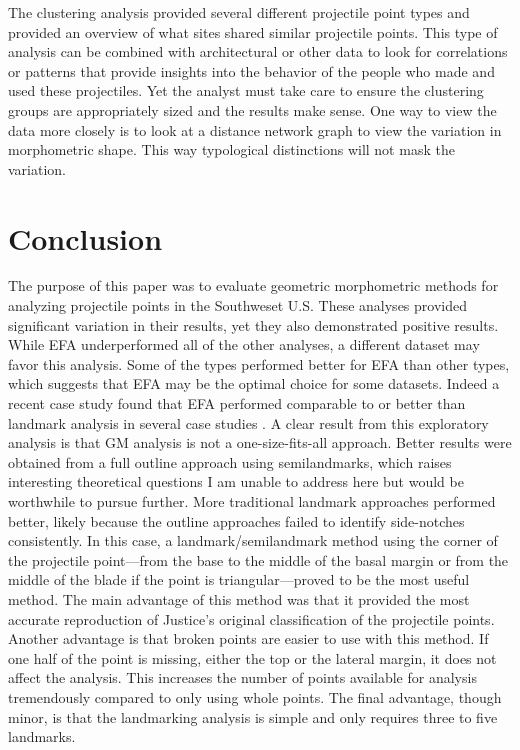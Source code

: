 \documentclass[PCJ,Unicode,screen,mode=plain]{cedram}
\begin{document}
The clustering analysis provided several different projectile point types and provided an overview of what sites shared similar projectile points. This type of analysis can be combined with architectural or other data to look for correlations or patterns that provide insights into the behavior of the people who made and used these projectiles. Yet the analyst must take care to ensure the clustering groups are appropriately sized and the results make sense. One way to view the data more closely is to look at a distance network graph to view the variation in morphometric shape. This way typological distinctions will not mask the variation.

\section{Conclusion}

The purpose of this paper was to evaluate geometric morphometric methods for analyzing projectile points in the Southweset U.S. These analyses provided significant variation in their results, yet they also demonstrated positive results. While EFA underperformed all of the other analyses, a different dataset may favor this analysis. Some of the types performed better for EFA than other types, which suggests that EFA may be the optimal choice for some datasets. Indeed a recent case study found that EFA performed comparable to or better than landmark analysis in several case studies \autocite{Matzig2021-id}. A clear result from this exploratory analysis is that GM analysis is not a one-size-fits-all approach. Better results were obtained from a full outline approach using semilandmarks, which raises interesting theoretical questions I am unable to address here but would be worthwhile to pursue further. More traditional landmark approaches performed better, likely because the outline approaches failed to identify side-notches consistently. In this case, a landmark/semilandmark method using the corner of the projectile point---from the base to the middle of the basal margin or from the middle of the blade if the point is triangular---proved to be the most useful method. The main advantage of this method was that it provided the most accurate reproduction of Justice's original classification of the projectile points. Another advantage is that broken points are easier to use with this method. If one half of the point is missing, either the top or the lateral margin, it does not affect the analysis. This increases the number of points available for analysis tremendously compared to only using whole points. The final advantage, though minor, is that the landmarking analysis is simple and only requires three to five landmarks.
\end{document}
